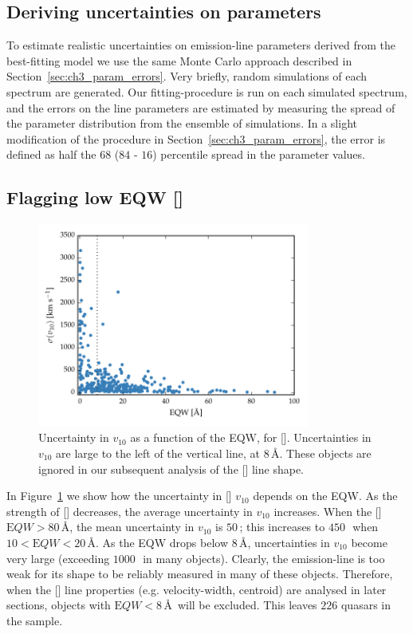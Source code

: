 \subsection{Deriving uncertainties on parameters}

To estimate realistic uncertainties on emission-line parameters derived from the best-fitting model we use the same Monte Carlo approach described in Section~\ref{sec:ch3_param_errors}. 
Very briefly, random simulations of each spectrum are generated.
Our fitting-procedure is run on each simulated spectrum, and the errors on the line parameters are estimated by measuring the spread of the parameter distribution from the ensemble of simulations. 
In a slight modification of the procedure in Section~\ref{sec:ch3_param_errors}, the error is defined as half the $68$ ($84$ - $16$) percentile spread in the parameter values. 

\subsection{Flagging low EQW []}
\label{sec:ch4-loweqw}

\begin{figure}
    \centering
    \includegraphics[width=0.8\textwidth]{figures/chapter04/eqw_cut.pdf} 
    \caption[{Uncertainty in $v_{10}$ as a function of the EQW, for [].}]{Uncertainty in $v_{10}$ as a function of the EQW, for []. Uncertainties in $v_{10}$ are large to the left of the vertical line, at $8$\,\AA. These objects are ignored in our subsequent analysis of the [] line shape.}     
    \label{fig:eqw_cut}
\end{figure}

In Figure~\ref{fig:eqw_cut} we show how the uncertainty in [] $v_{10}$ depends on the EQW. 
As the strength of [] decreases, the average uncertainty in $v_{10}$ increases.
When the [] ${\mathrm EQW} > 80$\,\AA, the mean uncertainty in $v_{10}$ is $50$\,\kms; this increases to $450$\,\kms\, when $10 < {\mathrm EQW} < 20$\,\AA. 
As the EQW drops below $8$\,\AA, uncertainties in $v_{10}$ become very large (exceeding $1000$\,\kms\, in many objects). 
Clearly, the emission-line is too weak for its shape to be reliably measured in many of these objects. 
Therefore, when the [] line properties (e.g. velocity-width, centroid) are analysed in later sections, objects with ${\mathrm EQW} < 8$\,\AA\, will be excluded. 
This leaves $226$ quasars in the sample. 

